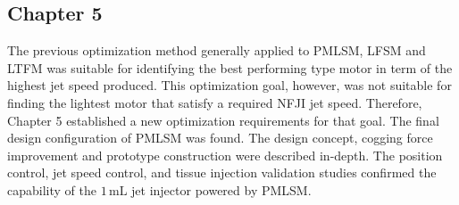     
    \subsection{Chapter 5}  \label{Chapter:intro/outline/chapter5}
    
    
    The previous optimization method generally applied to \acs{PMLSM}, \acs{LFSM} and \acs{LTFM} was suitable for identifying the best performing type motor in term of the highest jet speed produced. This optimization goal, however, was not suitable for finding the lightest motor that satisfy a required \acs{NFJI} jet speed. Therefore, Chapter 5 established a new optimization requirements for that goal. The final design configuration of \acs{PMLSM} was found. The design concept, cogging force improvement and prototype construction were described in-depth. The position control, jet speed control, and tissue injection validation studies confirmed the capability of the $1\,\mathrm{mL}$ jet injector powered by \acs{PMLSM}.
    